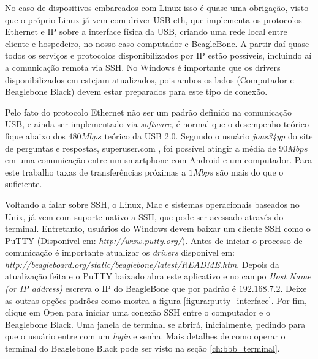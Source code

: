 No caso de dispositivos embarcados com Linux isso é quase uma obrigação, visto que o próprio Linux já vem com driver USB-eth, que implementa os protocolos Ethernet e IP sobre a interface física da USB, criando uma rede local entre cliente e hospedeiro, no nosso caso computador e BeagleBone. A partir daí quase todos os serviços e protocolos disponibilizados por IP estão possíveis, incluindo aí a comunicação remota via SSH. No Windows é importante que os drivers disponibilizados em \cite{bbbgettinstarted} estejam atualizados, pois ambos os lados (Computador e Beaglebone Black) devem estar preparados para este tipo de conexão. 

Pelo fato do protocolo Ethernet não ser um padrão definido na comunicação USB, e ainda ser implementado via \emph{software}, é normal que o desempenho teórico fique abaixo dos $480Mbps$ teórico da USB 2.0. Segundo o usuário \emph{jons34yp} do site de perguntas e respostas, superuser.com \cite{usbethernetspeed}, foi possível atingir a média de $90Mbps$ em uma comunicação entre um smartphone com Android e um computador.  Para este trabalho taxas de transferências próximas a $1Mbps$ são mais do que o suficiente.

Voltando a falar sobre SSH, o Linux, Mac e sistemas operacionais baseados no Unix, já vem com suporte nativo a SSH, que pode ser acessado através do terminal. Entretanto, usuários do Windows devem baixar um cliente SSH como o PuTTY (Disponível em: \emph{http://www.putty.org/}). Antes de iniciar o processo de comunicação é importante atualizar os \emph{drivers} disponivel em: \emph{http://beagleboard.org/static/beaglebone/latest/README.htm}. Depois da atualização feita e o PuTTY baixado abra este aplicativo e no campo \emph{Host Name (or IP address)} escreva o IP do BeagleBone que por padrão é $192.168.7.2$. Deixe as outras opções padrões como mostra a figura \ref{figura:putty_interface}. Por fim, clique em Open para iniciar uma conexão SSH entre o computador e o Beaglebone Black. Uma janela de terminal se abrirá, inicialmente, pedindo para que o usuário entre com um \emph{login} e senha. Mais detalhes de como operar o terminal do Beaglebone Black pode ser visto na seção \ref{ch:bbb_terminal}.

